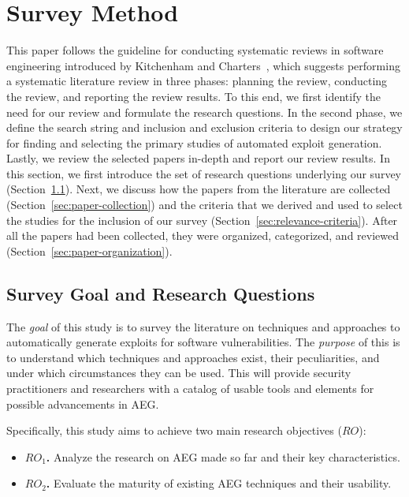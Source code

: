 \section{Survey Method}
\label{sec:methodology}
This paper follows the guideline for conducting systematic reviews in software engineering introduced by Kitchenham and Charters~\cite{keele2007guidelines}, which suggests performing a systematic literature review in three phases: planning the review, conducting the review, and reporting the review results.
To this end, we first identify the need for our review and formulate the research questions.
In the second phase, we define the search string and inclusion and exclusion criteria to design our strategy for finding and selecting the primary studies of automated exploit generation.
Lastly, we review the selected papers in-depth and report our review results.
%
In this section, we first introduce the set of research questions underlying our survey (Section~\ref{sec:research-questions}). Next, we discuss how the papers from the literature are collected (Section~\ref{sec:paper-collection}) and the criteria that we derived and used to select the studies for the inclusion of our survey (Section~\ref{sec:relevance-criteria}). After all the papers had been collected, they were organized, categorized, and reviewed (Section~\ref{sec:paper-organization}).
{}
{}

\subsection{Survey Goal and Research Questions}
\label{sec:research-questions}

The \textit{goal} of this study is to survey the literature on techniques and approaches to automatically generate exploits for software vulnerabilities.
The \textit{purpose} of this is to understand which techniques and approaches exist, their peculiarities, and under which circumstances they can be used.
This will provide security practitioners and researchers with a catalog of usable tools and elements for possible advancements in AEG.

Specifically, this study aims to achieve two main research objectives ($RO$):
\begin{itemize}
    \item \textbf{$RO_1$.} Analyze the research on AEG made so far and their key characteristics.
    \item \textbf{$RO_2$.} Evaluate the maturity of existing AEG techniques and their usability.
\end{itemize}

